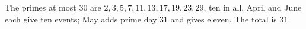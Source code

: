 The primes at most $30$ are $2,3,5,7,11,13,17,19,23,29$, ten in all. April and June each give ten events; May adds prime day $31$ and gives eleven. The total is $\boxed{31}$.

